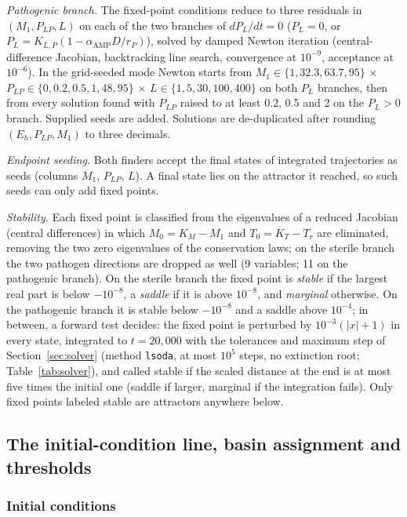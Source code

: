 \documentclass[11pt]{article}
\begin{document}
\emph{Pathogenic branch.} The fixed-point conditions reduce to three residuals in
$(M_1, P_{LP}, L)$ on each of the two branches of $dP_L/dt = 0$ ($P_L = 0$, or
$P_L = K_{L,P}(1 - \alpha_{\mathrm{AMP}} D / r_P)$), solved by damped Newton iteration
(central-difference Jacobian, backtracking line search, convergence at $10^{-9}$,
acceptance at $10^{-6}$). In the grid-seeded mode Newton starts from
$M_1 \in \{1, 32.3, 63.7, 95\}$ $\times$ $P_{LP} \in \{0, 0.2, 0.5, 1, 48, 95\}$ $\times$
$L \in \{1, 5, 30, 100, 400\}$ on both $P_L$ branches, then from every solution found with
$P_{LP}$ raised to at least 0.2, 0.5 and 2 on the $P_L > 0$ branch. Supplied seeds are
added. Solutions are de-duplicated after rounding $(E_h, P_{LP}, M_1)$ to three decimals.

\emph{Endpoint seeding.} Both finders accept the final states of integrated
trajectories as seeds (columns $M_1$, $P_{LP}$, $L$). A final state lies on the attractor
it reached, so such seeds can only add fixed points.

\emph{Stability.} Each fixed point is classified from the eigenvalues of a reduced
Jacobian (central differences) in which $M_0 = K_M - M_1$ and $T_0 = K_T - T_r$ are
eliminated, removing the two zero eigenvalues of the conservation laws; on the sterile
branch the two pathogen directions are dropped as well (9 variables; 11 on the
pathogenic branch). On the sterile
branch the fixed point is \emph{stable} if the largest real part is below $-10^{-8}$, a
\emph{saddle} if it is above $10^{-8}$, and \emph{marginal} otherwise. On the pathogenic
branch it is stable below $-10^{-8}$ and a saddle above $10^{-4}$; in between, a forward
test decides: the fixed point is perturbed by $10^{-3}(|x|+1)$ in every state,
integrated to $t = 20{,}000$ with the tolerances and maximum step of
Section~\ref{sec:solver} (method \texttt{lsoda}, at most $10^{5}$ steps, no extinction
root; Table~\ref{tab:solver}), and called
stable if the scaled distance at the end is at most five times the initial one (saddle
if larger, marginal if the integration fails). Only fixed points labeled stable are
attractors anywhere below.

\subsection{The initial-condition line, basin assignment and thresholds}
\label{sec:ic-line}

\subsubsection{Initial conditions}
\end{document}
